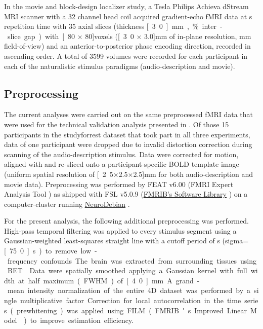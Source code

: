 \documentclass[english,11pt]{article}
\begin{document}
In the movie and block-design localizer study, a \unit[3]{Tesla} Philips Achieva dStream
MRI scanner with a 32 channel head coil acquired gradient-echo fMRI data
at \unit[2]{s} repetition time with
35 axial slices (thickness \unit[3.0]{mm}, \unit[10]{\%} inter-slice gap) with
\unit[80 $\times$ 80]{voxels} (\unit[3.0 $\times$ 3.0]{mm} of in-plane
resolution, \unit[240]{mm} field-of-view) and an anterior-to-posterior phase
encoding direction, recorded in ascending order.
A total of 3599 volumes were recorded for each participant in each of the
naturalistic stimulus paradigms (audio-description and movie).

\subsection*{Preprocessing}

The current analyses were carried out on the same preprocessed fMRI data
\citep{hanke2016aligned} that were used for the technical validation analysis
presented in \citet{hanke2016simultaneous}.
Of those 15 participants in the studyforrest dataset that took part in all three
experiments, data of one participant were dropped due to invalid distortion
correction during scanning of the audio-description stimulus.
Data were corrected for motion, aligned with and re-sliced onto a
participant-specific BOLD template image \citep{sengupta2016extension} (uniform
spatial resolution of \unit[2.5$\times$2.5$\times$2.5]{mm} for both
audio-description and movie data).
Preprocessing was performed by FEAT v6.00 (FMRI Expert Analysis Tool
\citep{woolrich2001autocorr}) as shipped with FSL v5.0.9
(\href{https://www.fmrib.ox.ac.uk/fsl}{FMRIB's Software Library}
\citep{smith2004fsl}) on a computer-cluster running
\href{http://neuro.debian.net}{NeuroDebian} \citep{halchenko2012open}.

For the present analysis, the following additional preprocessing was performed.
High-pass temporal filtering was applied to every stimulus segment using a
Gaussian-weighted least-squares straight line with a cutoff period of
\unit[150]{s} (sigma=\unit[75.0]{s}) to remove low-frequency confounds.
The brain was extracted from surrounding tissues using BET \citep{smith2002bet}.
Data were spatially smoothed applying a Gaussian kernel with full width at half
maximum (FWHM) of \unit[4.0]{mm}.
A grand-mean intensity normalization of the entire 4D dataset was performed by a
single multiplicative factor.
Correction for local autocorrelation in the time series (prewhitening) was
applied using FILM (FMRIB's Improved Linear Model \citep{woolrich2001autocorr})
to improve estimation efficiency.
\end{document}
